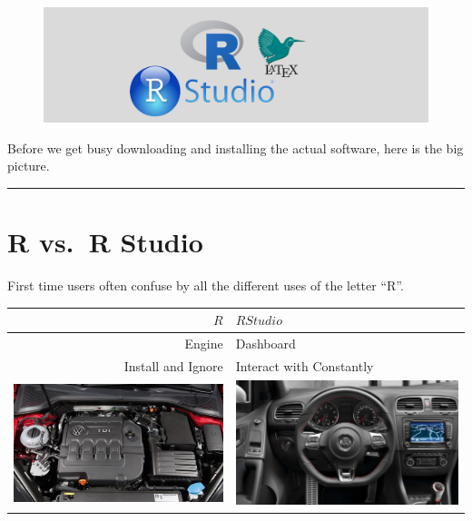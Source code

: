\documentclass[]{book}
\begin{document}
\begin{figure}
\centering
\includegraphics{images/headers/R_studio_LaTeX_header.png}
\caption{}
\end{figure}

Before we get busy downloading and installing the actual software, here
is the big picture.

\begin{center}\rule{0.5\linewidth}{\linethickness}\end{center}

\section{R vs.~R Studio}\label{r-vs.r-studio}

First time users often confuse by all the different uses of the letter
``R''.

\begin{longtable}[]{@{}rl@{}}
\toprule
\(R\) & \(R Studio\)\tabularnewline
\midrule
\endhead
Engine & Dashboard\tabularnewline
Install and Ignore & Interact with Constantly\tabularnewline
\includegraphics[width=5.20833in]{images/car_engine.jpg} &
\includegraphics[width=5.20833in]{images/car_dashboard.jpg}\tabularnewline
\bottomrule
\end{longtable}
\end{document}

